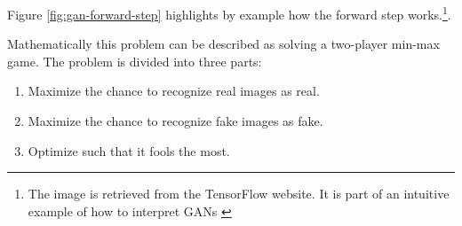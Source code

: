 \documentclass[journal]{IEEEtran}
\begin{document}
Figure \ref{fig:gan-forward-step} highlights by example how the forward step works.\footnote{The image is retrieved from the TensorFlow website. It is part of an intuitive example of how to interpret GANs \cite{tensorflow2020}}. 

Mathematically this problem can be described as solving a two-player min-max game. The problem is divided into three parts:

\begin{enumerate}
	\item Maximize the chance to recognize real images as real.
	\item Maximize the chance to recognize fake images as fake.
	\item Optimize  such that it fools  the most.\\
\end{enumerate}
\end{document}
